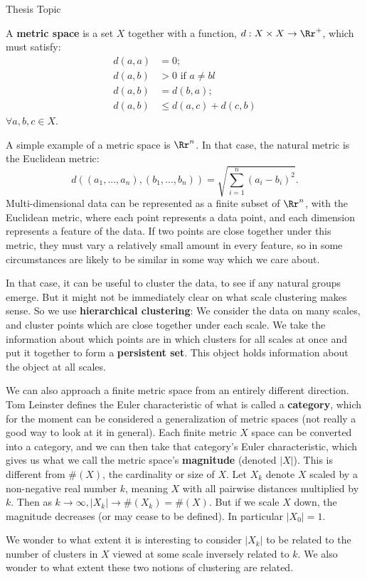\documentclass{article}
\begin{document}
\begin{center}{\Large Thesis Topic}\\ \vspace{1 ex} \end{center}
A \textbf{metric space} is a set $X$ together with a function, $d: X \times X \rightarrow \Rr^+$, which must satisfy:
\begin{align*}
d(a,a) &= 0;\\
d(a,b) & > 0 \text{ if } a \neq bl\\
d(a,b) &= d(b,a);\\
d(a,b) &\leq d(a,c) + d(c,b)
\end{align*}
$ \forall a,b,c \in X$.

A simple example of a metric space is $\Rr^n$. In that case, the natural metric is the Euclidean metric: 
\[
d\left((a_1,..., a_n), (b_1,...,b_n)\right) = \sqrt{\sum_{i=1}^n (a_i-b_i)^2}.
\]
Multi-dimensional data can be represented as a finite subset of $\Rr^n$, with the Euclidean metric, where each point represents a data point, and each dimension represents a feature of the data. If two points are close together under this metric, they must vary a relatively small amount in every feature, so in some circumstances are likely to be similar in some way which we care about.

In that case, it can be useful to cluster the data, to see if any natural groups emerge. But it might not be immediately clear on what scale clustering makes sense. So we use \textbf{hierarchical clustering}: We consider the data on many scales, and cluster points which are close together under each scale. We take the information about which points are in which clusters for all scales at once and put it together to form a \textbf{persistent set}. This object holds information about the object at all scales.

We can also approach a finite metric space from an entirely different direction. Tom Leinster defines the Euler characteristic of what is called a \textbf{category}, which for the moment can be considered a generalization of metric spaces (not really a good way to look at it in general). Each finite metric $X$ space can be converted into a category, and we can then take that category's Euler characteristic, which gives us what we call the metric space's \textbf{magnitude} (denoted $|X|$). This is different from $\#(X)$, the cardinality or size of $X$. Let $X_k$ denote $X$ scaled by a non-negative real number $k$, meaning $X$ with all pairwise distances multiplied by $k$. Then as $k \rightarrow \infty, |X_k| \rightarrow \#(X_k) = \#(X)$. But if we scale $X$ down, the magnitude decreases (or may cease to be defined). In particular $|X_0| = 1$. 

We wonder to what extent it is interesting to consider $|X_k|$ to be related to the number of clusters in $X$ viewed at some scale inversely related to $k$. We also wonder to what extent these two notions of clustering are related.
\end{document}
